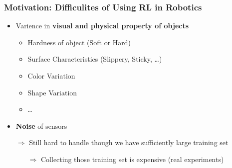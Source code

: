 \documentclass{beamer}
\newcommand{\firstSec}{Motivation}
\begin{document}
    \begin{frame}
      \frametitle{\firstSec : Difficulites of Using RL in Robotics}
      \begin{itemize}
        \item Varience in \textbf{visual and physical property of objects}
        \begin{itemize}
          \item Hardness of object (Soft or Hard)
          \item Surface Characteristics (Slippery, Sticky, \ldots)
          \item Color Variation
          \item Shape Variation
          \item \ldots
        \end{itemize}
        \item \textbf{Noise} of sensors
      \end{itemize}
      \begin{itemize}
        \setlength{\itemindent}{.3in}
        \item[$\Rightarrow$] Still hard to handle though we have sufficiently large training set
        \begin{itemize}
          \setlength{\itemindent}{0.3in}
          \item[$\Rightarrow$] Collecting those training set is expensive (real experiments) 
        \end{itemize}
      \end{itemize}
    \end{frame}
\end{document}
